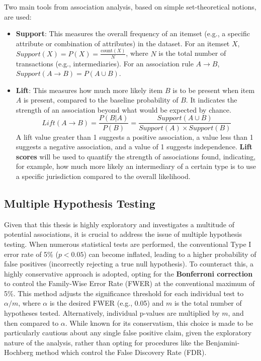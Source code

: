 Two main tools from association analysis, based on simple set-theoretical notions, are used:
\begin{itemize}
    \item \textbf{Support}: This measures the overall frequency of an itemset (e.g., a specific attribute or combination of attributes) in the dataset. For an itemset $X$, $Support(X) = P(X) = \frac{\text{count}(X)}{N}$, where $N$ is the total number of transactions (e.g., intermediaries). For an association rule $A \rightarrow B$, $Support(A \rightarrow B) = P(A \cup B)$.
    \item \textbf{Lift}: This measures how much more likely item $B$ is to be present when item $A$ is present, compared to the baseline probability of $B$. It indicates the strength of an association beyond what would be expected by chance.
    \begin{equation}
        Lift(A \rightarrow B) = \frac{P(B|A)}{P(B)} = \frac{Support(A \cup B)}{Support(A) \times Support(B)}
    \end{equation}
    A lift value greater than 1 suggests a positive association, a value less than 1 suggests a negative association, and a value of 1 suggests independence. \textbf{Lift scores} will be used to quantify the strength of associations found, indicating, for example, how much more likely an intermediary of a certain type is to use a specific jurisdiction compared to the overall likelihood.
\end{itemize}

\subsection{Multiple Hypothesis Testing}
\label{subsec:multiple_hypothesis_testing}
Given that this thesis is highly exploratory and investigates a multitude of potential associations, it is crucial to address the issue of multiple hypothesis testing. When numerous statistical tests are performed, the conventional Type I error rate of 5\% ($p < 0.05$) can become inflated, leading to a higher probability of false positives (incorrectly rejecting a true null hypothesis). To counteract this, a highly conservative approach is adopted, opting for the \textbf{Bonferroni correction} to control the Family-Wise Error Rate (FWER) at the conventional maximum of 5\%. This method adjusts the significance threshold for each individual test to $\alpha/m$, where $\alpha$ is the desired FWER (e.g., 0.05) and $m$ is the total number of hypotheses tested. Alternatively, individual p-values are multiplied by $m$, and then compared to $\alpha$. While known for its conservatism, this choice is made to be particularly cautious about any single false positive claim, given the exploratory nature of the analysis, rather than opting for procedures like the Benjamini-Hochberg method which control the False Discovery Rate (FDR).

